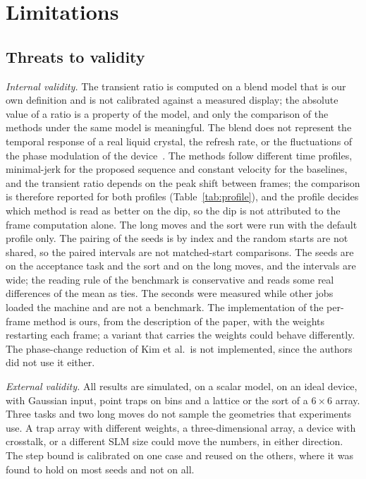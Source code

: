 \section{Limitations}\label{sec:limits}

\subsection{Threats to validity}

\emph{Internal validity.} The transient ratio is computed on a blend model that is our own definition and is not calibrated against a measured display; the absolute value of a ratio is a property of the model, and only the comparison of the methods under the same model is meaningful. The blend does not represent the temporal response of a real liquid crystal, the refresh rate, or the fluctuations of the phase modulation of the device~\cite{lizana}. The methods follow different time profiles, minimal-jerk for the proposed sequence and constant velocity for the baselines, and the transient ratio depends on the peak shift between frames; the comparison is therefore reported for both profiles (Table~\ref{tab:profile}), and the profile decides which method is read as better on the dip, so the dip is not attributed to the frame computation alone. The long moves and the sort were run with the default profile only. The pairing of the seeds is by index and the random starts are not shared, so the paired intervals are not matched-start comparisons. The seeds are \nSeedsTwo{} on the acceptance task and the sort and \longSeeds{} on the long moves, and the intervals are wide; the reading rule of the benchmark is conservative and reads some real differences of the mean as ties. The seconds were measured while other jobs loaded the machine and are not a benchmark. The implementation of the per-frame method is ours, from the description of the paper, with the weights restarting each frame; a variant that carries the weights could behave differently. The phase-change reduction of Kim et al.\ is not implemented, since the authors did not use it either.

\emph{External validity.} All results are simulated, on a scalar model, on an ideal device, with Gaussian input, point traps on bins and a lattice or the sort of a $6\times6$ array. Three tasks and two long moves do not sample the geometries that experiments use. A trap array with different weights, a three-dimensional array, a device with crosstalk, or a different SLM size could move the numbers, in either direction. The step bound is calibrated on one case and reused on the others, where it was found to hold on most seeds and not on all.

